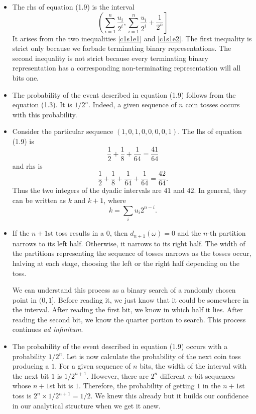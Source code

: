 \begin{itemize}
\item The rhs of equation (1.9) is the interval
\[
\left(\sum_{i=1}^n\frac{u_i}{2^i}, \sum_{i=1}^n\frac{u_i}{2^i} + \frac{1}{2^n}
\right]
\]
It arises from the two inequalities \eqref{c1s1e1} and \eqref{c1s1e2}. The first
inequality is strict only because we forbade terminating binary representations.
The second inequality is not strict because every terminating binary 
representation has a corresponding non-terminating representation will all
bits one.

\item The probability of the event described in equation (1.9) follows from
the equation (1.3). It is $1/2^n$. Indeed, a given sequence of $n$ coin tosses
occurs with this probability.

\item Consider the particular sequence $(1, 0, 1, 0, 0, 0, 0, 1)$. The lhs of
equation (1.9) is
\[
\frac{1}{2} + \frac{1}{8} + \frac{1}{64} = \frac{41}{64}
\]
and rhs is
\[
\frac{1}{2} + \frac{1}{8} + \frac{1}{64} + \frac{1}{64} = \frac{42}{64}.
\]
Thus the two integers of the dyadic intervals are $41$ and $42$. In general,
they can be written as $k$ and $k + 1$, where 
\begin{equation}\label{c1s1e3}
k = \sum_{i} u_i2^{n-i}.
\end{equation}

\item If the $n + 1$st toss results in a $0$, then $d_{n+1}(\omega) = 0$ and
the $n$-th partition narrows to its left half. Otherwise, it narrows to its
right half. The width of the partitions representing the sequence of tosses
narrows as the tosses occur, halving at each stage, choosing the left or the
right half depending on the toss.

We can understand this process as a binary search of a randomly chosen point in
$(0, 1]$. Before reading it, we just know that it could be somewhere in the
interval. After reading the first bit, we know in which half it lies. After
reading the second bit, we know the quarter portion to search. This process
continues \emph{ad infinitum}.

\item The probability of the event described in equation (1.9) occurs with a
probability $1/2^n$. Let is now calculate the probability of the next coin toss
producing a $1$. For a given sequence of $n$ bits, the width of the interval 
with the next bit $1$ is $1/2^{n+1}$. However, there are $2^n$ different $n$-bit
sequences whose $n+1$st bit is $1$. Therefore, the probability of getting $1$
in the $n + 1$st toss is $2^n \times 1/2^{n+1} = 1/2$. We knew this already but
it builds our confidence in our analytical structure when we get it anew.


\end{itemize}

